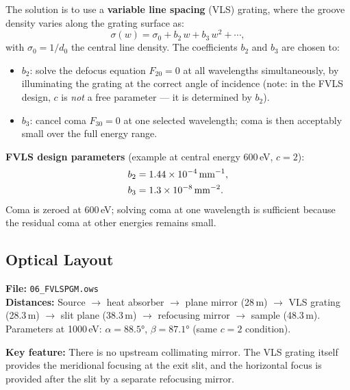 \documentclass[12pt,a4paper]{article}
\newcommand{\al}{\alpha}
\newcommand{\be}{\beta}
\begin{document}
The solution is to use a \textbf{variable line spacing} (VLS) grating, where the groove
density varies along the grating surface as:
\begin{equation}
  \sigma(w) = \sigma_0 + b_2\,w + b_3\,w^2 + \cdots,
  \label{eq:VLS}
\end{equation}
with $\sigma_0 = 1/d_0$ the central line density.  The coefficients $b_2$ and $b_3$
are chosen to:

\begin{itemize}
  \item $b_2$: solve the defocus equation $F_{20} = 0$ at all wavelengths simultaneously,
        by illuminating the grating at the correct angle of incidence (note: in the FVLS
        design, $c$ is \emph{not} a free parameter --- it is determined by $b_2$).
  \item $b_3$: cancel coma $F_{30} = 0$ at one selected wavelength; coma is then
        acceptably small over the full energy range.
\end{itemize}

\begin{keyresult}
\textbf{FVLS design parameters} (example at central energy 600\,eV, $c = 2$):
\begin{align}
  b_2 &= 1.44 \times 10^{-4}\,\mathrm{mm}^{-1}, \notag\\
  b_3 &= 1.3  \times 10^{-8}\,\mathrm{mm}^{-2}. \notag
\end{align}
Coma is zeroed at 600\,eV; solving coma at one wavelength is sufficient because the
residual coma at other energies remains small.
\end{keyresult}

\subsection{Optical Layout}

\begin{exbox}
\textbf{File:} \texttt{06\_FVLSPGM.ows}\\[4pt]
\textbf{Distances:} Source $\to$ heat absorber $\to$ plane mirror (28\,m) $\to$ VLS
grating (28.3\,m) $\to$ slit plane (38.3\,m) $\to$ refocusing mirror $\to$ sample
(48.3\,m).\\
Parameters at 1000\,eV: $\al = 88.5°$, $\be = 87.1°$ (same $c = 2$ condition).

\medskip
\textbf{Key feature:} There is no upstream collimating mirror.  The VLS grating itself
provides the meridional focusing at the exit slit, and the horizontal focus is provided
after the slit by a separate refocusing mirror.
\end{exbox}
\end{document}
